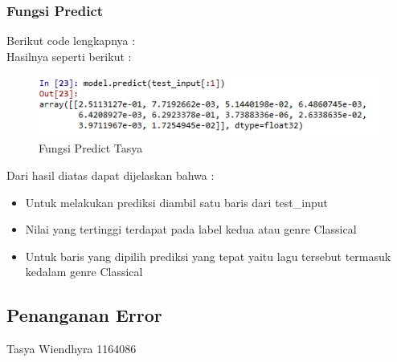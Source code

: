 \begin{enumerate}
\begin{itemize}
\subsubsection{Fungsi Predict}
Berikut code lengkapnya : \\

Hasilnya seperti berikut : \\
\begin{figure}[ht]
\centering
\includegraphics[scale=0.5]{figures/chapter6tasya22.png}
\caption{Fungsi Predict Tasya}
\label{Praktek}
\end{figure}
Dari hasil diatas dapat dijelaskan bahwa :\\
\begin{itemize}
\item Untuk melakukan prediksi diambil satu baris dari test\_input
\item Nilai yang tertinggi terdapat pada label kedua atau genre Classical
\item Untuk baris yang dipilih prediksi yang tepat yaitu lagu tersebut termasuk kedalam genre Classical
\end{itemize}

\subsection{Penanganan Error}
Tasya Wiendhyra 1164086

\end{itemize}
\end{enumerate}
